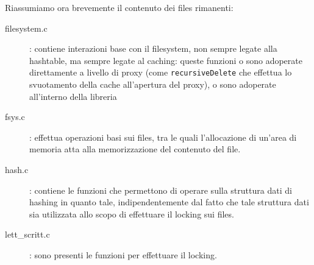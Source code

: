 Riassumiamo ora brevemente il contenuto dei files rimanenti:
\begin{description}
\item[filesystem.c]: contiene interazioni base con il filesystem, non sempre
	legate alla hashtable, ma sempre legate al caching: queste funzioni
	o sono adoperate direttamente a livello di proxy (come \texttt{recursiveDelete}
	che effettua lo svuotamento della cache all'apertura del proxy), o sono
	adoperate all'interno della libreria
\item[fsys.c]: effettua operazioni basi sui files, tra le quali l'allocazione
	di un'area di memoria atta alla memorizzazione del contenuto del file.
\item[hash.c]: contiene le funzioni che permettono di operare sulla struttura
	dati di hashing in quanto tale, indipendentemente dal fatto che tale
	struttura dati sia utilizzata allo scopo di effettuare il locking sui files.
\item[lett\_scritt.c]: sono presenti le funzioni per effettuare il locking.
\end{description}
